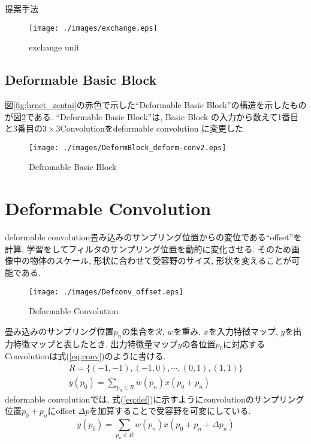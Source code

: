 \begin{chapter}{提案手法}
\begin{figure}[H]
  \centering
  \texttt{[image: ./images/exchange.eps]}
  \caption{exchange unit\cite{hrnet}}
  \label{fig:exchange}
\end{figure}

\subsection{Deformable Basic Block}\label{subsec:DBB}
図\ref{fig:hrnet_zentai}の赤色で示した``Deformable Basic Block''の構造を示したものが図\ref{fig:deformablebasicblock}である. 
``Deformable Basic Block''は, Basic Block の入力から数えて1番目と3番目の$3\times3$Convolutionをdeformable convolution に変更した

\begin{figure}[H]
  \centering
  \texttt{[image: ./images/DeformBlock\_deform-conv2.eps]}
  \caption{Defromable Basic Block}
  \label{fig:deformablebasicblock}
\end{figure}


\section{Deformable Convolution}
deformable convolution畳み込みのサンプリング位置からの変位である``offset''を計算, 学習をしてフィルタのサンプリング位置を動的に変化させる. そのため画像中の物体のスケール, 形状に合わせて受容野のサイズ, 形状を変えることが可能である.\\
\begin{figure}[H]
  \centering
  \texttt{[image: ./images/Defconv\_offset.eps]}
  \caption{Deformable Convolution}
  \label{fig:defconv_offset}
\end{figure}
畳み込みのサンプリング位置$p_n$の集合を$\mathcal{R}$, $w$を重み, $x$を入力特徴マップ, $y$を出力特徴マップと表したとき, 出力特徴量マップ$y$の各位置$p_0$に対応するConvolutionは式(\ref{eq:conv})のように書ける.
\begin{eqnarray}
  R = \{(-1,-1), (-1,0),\cdots,(0,1), (1,1)\} \nonumber \\
  y(p_0) = \sum_{p_n\in R}^{} w(p_n)x(p_0 + p_n) \label{eq:conv} 
\end{eqnarray}
deformable convolutionでは, 式(\ref{eq:def})に示すようにconvolutionのサンプリング位置$p_0 + p_n$にoffset $\Delta p$を加算することで受容野を可変にしている.
\begin{equation}
y(p_0) = \sum_{p_n\in R}^{} w(p_n)x(p_0 + p_n + \Delta p_n) \label{eq:def}
\end{equation}



\end{chapter}

